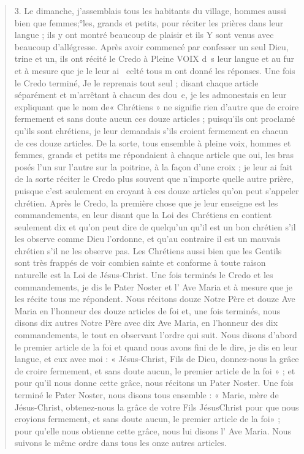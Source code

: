 \begin{quote}
3. Le dimanche, j'assemblais tous les habitants du village, hommes
aussi bien que femmes;°les, grands et petits, pour réciter les prières
dans leur langue ; ils y ont montré beaucoup de plaisir et ils
Y sont venus avec beaucoup d'allégresse. Après avoir commencé
par confesser un seul Dieu, trine et un, ils ont récité le Credo à
Pleine VOIX d~s leur langue et au fur et à mesure que je le leur ai
~eclté tous m ont donné les réponses. Une fois le Credo terminé,
Je le reprenais tout seul ; disant chaque article séparément et
m'arrêtant à chacun des dou~e, je les admonestais en leur expliquant que le nom de« Chrétiens » ne signifie rien d'autre que de
croire fermement et sans doute aucun ces douze articles ; puisqu'ils
ont proclamé qu'ils sont chrétiens, je leur demandais s'ils croient
fermement en chacun de ces douze articles. De la sorte, tous ensemble  à pleine voix, hommes et femmes, grands et petits me répondaient
à chaque article que oui, les bras posés l'un sur l'autre sur
la poitrine, à la façon d'une croix ; je leur ai fait de la sorte réciter
le Credo plus souvent que n'importe quelle autre prière, puisque
c'est seulement en croyant à ces douze articles qu'on peut
s'appeler chrétien. Après le Credo, la première chose que je leur
enseigne est les commandements, en leur disant que la Loi des
Chrétiens en contient seulement dix et qu'on peut dire de quelqu'un
qu'il est un bon chrétien s'il les observe comme Dieu l'ordonne,
et qu'au contraire il est un mauvais chrétien s'il ne les observe pas.
Les Chrétiens aussi bien que les Gentils sont très frappés de voir
combien sainte et conforme à toute raison naturelle est la Loi de
Jésus-Christ. Une fois terminés le Credo et les commandements,
je dis le Pater Noster et l' Ave Maria et à mesure que je les récite
tous me répondent. Nous récitons douze Notre Père et douze Ave
Maria en l'honneur des douze articles de foi et, une fois terminés,
nous disons dix autres Notre Père avec dix Ave Maria, en l'honneur
des dix commandements, le tout en observant l'ordre qui suit.
Nous disons d'abord le premier article de la foi et quand nous
avons fini de le dire, je dis en leur langue, et eux avec moi :
« Jésus-Christ, Fils de Dieu, donnez-nous la grâce de croire fermement,
et sans doute aucun, le premier article de la foi » ; et pour
qu'il nous donne cette grâce, nous récitons un Pater Noster. Une
fois terminé le Pater Noster, nous disons tous ensemble : « Marie,
mère de Jésus-Christ, obtenez-nous la grâce de votre Fils JésusChrist
pour que nous croyions fermement, et sans doute aucun, le
premier article de la foi» ; pour qu'elle nous obtienne cette grâce,
nous lui disons l' Ave Maria. Nous suivons le même ordre dans tous
les onze autres articles.



\end{quote}
